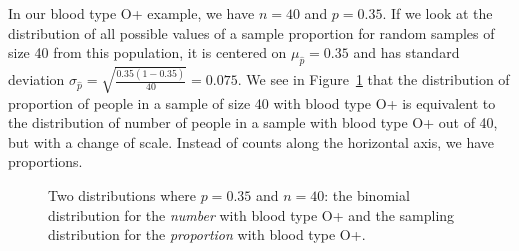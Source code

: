 In our blood type O+ example, we have $n=40$ and $p=0.35$.  If we look at the distribution of all possible values of a sample proportion for random samples of size 40 from this population, it is centered on $\mu_{\hat{p}} = 0.35$ and has standard deviation $\sigma_{\hat{p}} = \sqrt{\frac{0.35(1-0.35)}{40}}=0.075$.
We see in Figure~\ref{oPositive40prop} that the distribution of proportion of people in a sample of size 40 with blood type O+ is equivalent to the distribution of number of people in a sample with blood type O+ out of 40, but with a change of scale.  Instead of counts along the horizontal axis, we have proportions.  

\begin{figure}[ht]
\centering
{}
\caption{Two distributions where $p=0.35$ and $n=40$:  the binomial distribution for the \emph{number} with blood type O+ and the sampling distribution for the \emph{proportion} with blood type O+. }
\label{oPositive40prop}
\end{figure}



